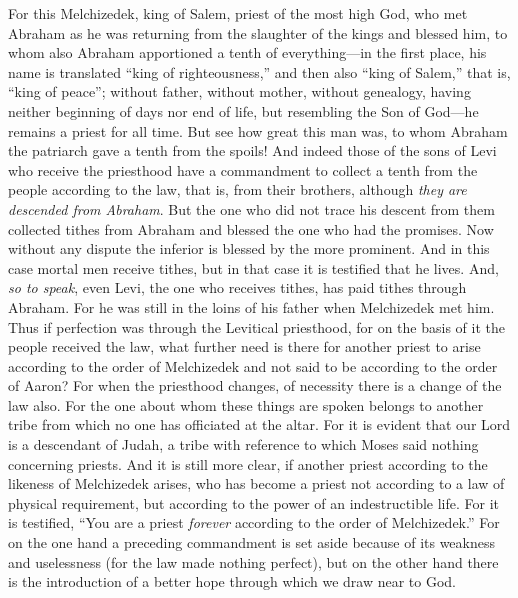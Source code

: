\begin{biblechapter} %
 For this Melchizedek, king of Salem, priest of the most high God, who met Abraham as he was returning from the slaughter of the kings and blessed him,
\verse to whom also Abraham apportioned a tenth of everything—in the first place, his name is translated “king of righteousness,” and then also “king of Salem,” that is, “king of peace”;
\verse without father, without mother, without genealogy, having neither beginning of days nor end of life, but resembling the Son of God—he remains a priest for all time.
\verse But see how great this man was, to whom Abraham the patriarch gave a tenth from the spoils!
\verse And indeed those of the sons of Levi who receive the priesthood have a commandment to collect a tenth from the people according to the law, that is, from their brothers, although \textit{they are descended from Abraham}.
\verse But the one who did not trace his descent from them collected tithes from Abraham and blessed the one who had the promises.
\verse Now without any dispute the inferior is blessed by the more prominent.
\verse And in this case mortal men receive tithes, but in that case it is testified that he lives.
\verse And, \textit{so to speak}, even Levi, the one who receives tithes, has paid tithes through Abraham.
\verse For he was still in the loins of his father when Melchizedek met him.
 Thus if perfection was through the Levitical priesthood, for on the basis of it the people received the law, what further need is there for another priest to arise according to the order of Melchizedek and not said to be according to the order of Aaron?
\verse For when the priesthood changes, of necessity there is a change of the law also.
\verse For the one about whom these things are spoken belongs to another tribe from which no one has officiated at the altar.
\verse For it is evident that our Lord is a descendant of Judah, a tribe with reference to which Moses said nothing concerning priests.
\verse And it is still more clear, if another priest according to the likeness of Melchizedek arises,
\verse who has become a priest not according to a law of physical requirement, but according to the power of an indestructible life.
\verse For it is testified, “You are a priest \textit{forever} according to the order of Melchizedek.”
\verse For on the one hand a preceding commandment is set aside because of its weakness and uselessness
\verse (for the law made nothing perfect), but on the other hand there is the introduction of a better hope through which we draw near to God.

\end{biblechapter}
